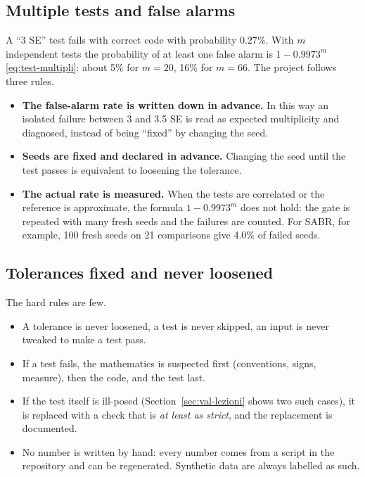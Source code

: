 \subsection{Multiple tests and false alarms}
A ``3 SE'' test fails with correct code with probability $0.27\%$. With $m$ independent tests the probability of at
least one false alarm is $1-0.9973^m$ \eqref{eq:test-multipli}: about 5\% for $m=20$, 16\% for $m=66$. The project
follows three rules.
\begin{itemize}
\item \textbf{The false-alarm rate is written down in advance.} In this way an isolated failure between 3 and 3.5 SE is
read as expected multiplicity and diagnosed, instead of being ``fixed'' by changing the seed.
\item \textbf{Seeds are fixed and declared in advance.} Changing the seed until the test passes is equivalent to
loosening the tolerance.
\item \textbf{The actual rate is measured.} When the tests are correlated or the reference is approximate, the formula
$1-0.9973^m$ does not hold: the gate is repeated with many fresh seeds and the failures are counted. For SABR, for
example, 100 fresh seeds on 21 comparisons give 4.0\% of failed seeds.
\end{itemize}

\subsection{Tolerances fixed and never loosened}
The hard rules are few.
\begin{itemize}
\item A tolerance is never loosened, a test is never skipped, an input is never tweaked to make a test pass.
\item If a test fails, the mathematics is suspected first (conventions, signs, measure), then the code, and the test
last.
\item If the test itself is ill-posed (Section~\ref{sec:val-lezioni} shows two such cases), it is replaced with a check
that is \emph{at least as strict}, and the replacement is documented.
\item No number is written by hand: every number comes from a script in the repository and can be regenerated.
Synthetic data are always labelled as such.
\end{itemize}

